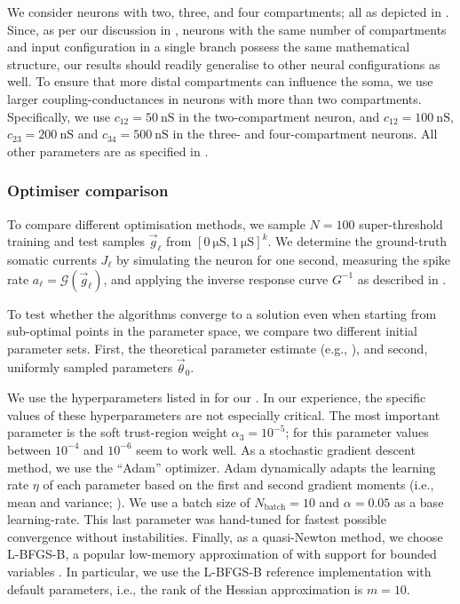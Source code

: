 We consider \nlif neurons with two, three, and four compartments; all as depicted in .
Since, as per our discussion in , \nlif neurons with the same number of compartments and input configuration in a single branch possess the same mathematical structure, our results should readily generalise to other neural configurations as well.
To ensure that more distal compartments can influence the soma, we use larger coupling-conductances in neurons with more than two compartments.
Specifically, we use $c_{12} = \SI{50}{\nano\siemens}$ in the two-compartment \LIF neuron, and $c_{12} = \SI{100}{\nano\siemens}$, $c_{23} = \SI{200}{\nano\siemens}$ and $c_{34} = \SI{500}{\nano\siemens}$ in the three- and four-compartment neurons.
All other parameters are as specified in .

\subsubsection{Optimiser comparison}
To compare different optimisation methods, we sample $N = 100$ super-threshold training and test samples $\vec g_\ell$ from $[\SI{0}{\micro\siemens}, \SI{1}{\micro\siemens}]^k$.
We determine the ground-truth somatic currents $J_\ell$ by simulating the neuron for one second, measuring the spike rate $a_\ell = \mathscr{G}(\vec g_\ell)$, and applying the inverse response curve $G^{-1}$ as described in .

To test whether the algorithms converge to a solution even when starting from sub-optimal points in the parameter space, we compare two different initial parameter sets.
First, the theoretical parameter estimate (e.g., ), and second, uniformly sampled parameters $\vec \theta_0$.

We use the hyperparameters listed in  for our \QP.
In our experience, the specific values of these hyperparameters are not especially critical.
The most important parameter is the soft trust-region weight $\alpha_3 = 10^{-5}$; for this parameter values between $10^{-4}$ and $10^{-6}$ seem to work well.
As a stochastic gradient descent method, we use the \enquote{Adam} optimizer.
Adam dynamically adapts the learning rate $\eta$ of each parameter based on the first and second gradient moments (i.e., mean and variance; \cite{kingma2015adam}).
We use a batch size of $N_\mathrm{batch} = 10$ and $\alpha = 0.05$ as a base learning-rate.
This last parameter was hand-tuned for fastest possible convergence without instabilities.
Finally, as a quasi-Newton method, we choose L-BFGS-B, a popular low-memory approximation of \BFGS with support for bounded variables \citep{byrd1995limited}.
In particular, we use the L-BFGS-B reference implementation with default parameters, i.e., the rank of the Hessian approximation is $m = 10$.

